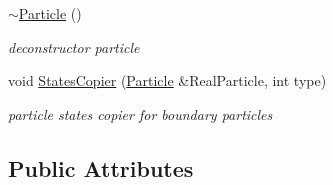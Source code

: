 \begin{CompactItemize}
\hyperlink{classParticle_d030d0fe7b88cf81744b127c99244ff4}{$\sim$Particle} ()
\begin{CompactList}\small\item\em deconstructor particle \item\end{CompactList}\item 
void \hyperlink{classParticle_d202d28edab1253eb51be75ea0cbdbfd}{StatesCopier} (\hyperlink{classParticle}{Particle} \&RealParticle, int type)
\begin{CompactList}\small\item\em particle states copier for boundary particles \item\end{CompactList}\end{CompactItemize}
\subsection*{Public Attributes}
